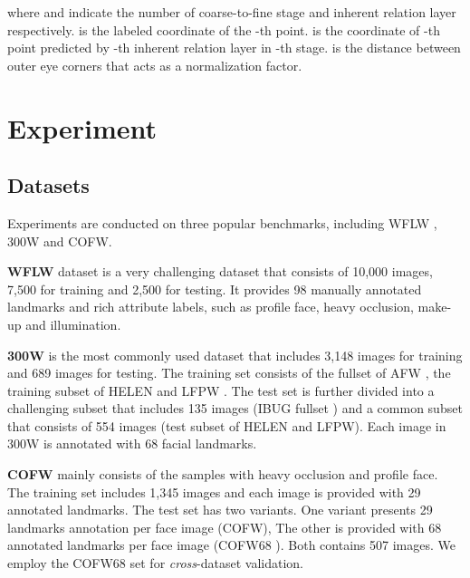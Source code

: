 \documentclass[10pt,twocolumn,letterpaper]{article}
\begin{document}
where  and  indicate the number of coarse-to-fine stage and inherent relation layer respectively.  is the labeled coordinate of the -th point.  is the coordinate of -th point predicted by -th inherent relation layer in -th stage.  is the distance between outer eye corners that acts as a normalization factor.

\section{Experiment}
\subsection{Datasets}
Experiments are conducted on three popular benchmarks, including WFLW \cite{LAB}, 300W\cite{300W} and COFW\cite{COFW}.

\textbf{WFLW} dataset is a very challenging dataset that consists of 10,000 images, 7,500 for training and 2,500 for testing. It provides 98 manually annotated landmarks and rich attribute labels, such as profile face, heavy occlusion, make-up and illumination.

\textbf{300W} is the most commonly used dataset that includes 3,148 images for training and 689 images for testing. The training set consists of the fullset of AFW \cite{AFW}, the training subset of HELEN \cite{HELEN} and LFPW \cite{LFPW}. The test set is further divided into a challenging subset that includes 135 images (IBUG fullset \cite{300W}) and a common subset that consists of 554 images (test subset of HELEN and LFPW). Each image in 300W is annotated with 68 facial landmarks.

\textbf{COFW} mainly consists of the samples with heavy occlusion and profile face. The training set includes 1,345 images and each image is provided with 29 annotated landmarks. The test set has two variants. One variant presents 29 landmarks annotation per face image (COFW),  The other is provided with 68 annotated landmarks per face image (COFW68 \cite{COFW68}). Both contains 507 images. We employ the COFW68 set for \textit{cross}-dataset validation. 
\end{document}

